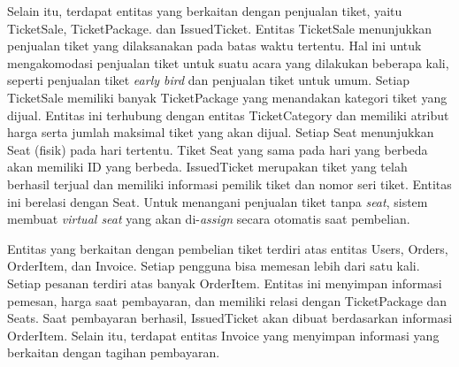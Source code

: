 Selain itu, terdapat entitas yang berkaitan dengan penjualan tiket, yaitu TicketSale, TicketPackage. dan IssuedTicket. Entitas TicketSale menunjukkan penjualan tiket yang dilaksanakan pada batas waktu tertentu. Hal ini untuk mengakomodasi penjualan tiket untuk suatu acara yang dilakukan beberapa kali, seperti penjualan tiket \textit{early bird} dan penjualan tiket untuk umum. Setiap TicketSale memiliki banyak TicketPackage yang menandakan kategori tiket yang dijual. Entitas ini terhubung dengan entitas TicketCategory dan memiliki atribut harga serta jumlah maksimal tiket yang akan dijual. Setiap Seat menunjukkan Seat (fisik) pada hari tertentu. Tiket Seat yang sama pada hari yang berbeda akan memiliki ID yang berbeda. IssuedTicket merupakan tiket yang telah berhasil terjual dan memiliki informasi pemilik tiket dan nomor seri tiket. Entitas ini berelasi dengan Seat. Untuk menangani penjualan tiket tanpa \textit{seat}, sistem membuat \textit{virtual seat} yang akan di-\textit{assign} secara otomatis saat pembelian.

Entitas yang berkaitan dengan pembelian tiket terdiri atas entitas Users, Orders, OrderItem, dan Invoice. Setiap pengguna bisa memesan lebih dari satu kali. Setiap pesanan terdiri atas banyak OrderItem. Entitas ini menyimpan informasi pemesan, harga saat pembayaran, dan memiliki relasi dengan TicketPackage dan Seats. Saat pembayaran berhasil, IssuedTicket akan dibuat berdasarkan informasi OrderItem. Selain itu, terdapat entitas Invoice yang menyimpan informasi yang berkaitan dengan tagihan pembayaran.